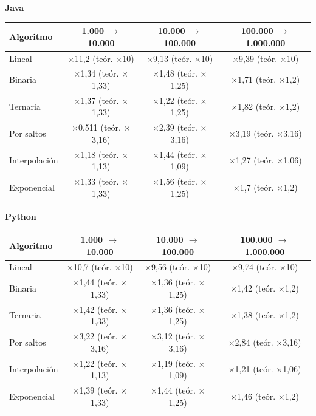 \textbf{Java}\par\smallskip
{\footnotesize
\begin{tabular}{lccc}
\toprule
Algoritmo & 1.000 $\to$ 10.000 & 10.000 $\to$ 100.000 & 100.000 $\to$ 1.000.000 \\
\midrule
Lineal & $\times$11,2 (te\'or. $\times$10) & $\times$9,13 (te\'or. $\times$10) & $\times$9,39 (te\'or. $\times$10) \\
Binaria & $\times$1,34 (te\'or. $\times$1,33) & $\times$1,48 (te\'or. $\times$1,25) & $\times$1,71 (te\'or. $\times$1,2) \\
Ternaria & $\times$1,37 (te\'or. $\times$1,33) & $\times$1,22 (te\'or. $\times$1,25) & $\times$1,82 (te\'or. $\times$1,2) \\
Por saltos & $\times$0,511 (te\'or. $\times$3,16) & $\times$2,39 (te\'or. $\times$3,16) & $\times$3,19 (te\'or. $\times$3,16) \\
Interpolaci\'on & $\times$1,18 (te\'or. $\times$1,13) & $\times$1,44 (te\'or. $\times$1,09) & $\times$1,27 (te\'or. $\times$1,06) \\
Exponencial & $\times$1,33 (te\'or. $\times$1,33) & $\times$1,56 (te\'or. $\times$1,25) & $\times$1,7 (te\'or. $\times$1,2) \\
\bottomrule
\end{tabular}}\par
\medskip
\textbf{Python}\par\smallskip
{\footnotesize
\begin{tabular}{lccc}
\toprule
Algoritmo & 1.000 $\to$ 10.000 & 10.000 $\to$ 100.000 & 100.000 $\to$ 1.000.000 \\
\midrule
Lineal & $\times$10,7 (te\'or. $\times$10) & $\times$9,56 (te\'or. $\times$10) & $\times$9,74 (te\'or. $\times$10) \\
Binaria & $\times$1,44 (te\'or. $\times$1,33) & $\times$1,36 (te\'or. $\times$1,25) & $\times$1,42 (te\'or. $\times$1,2) \\
Ternaria & $\times$1,42 (te\'or. $\times$1,33) & $\times$1,36 (te\'or. $\times$1,25) & $\times$1,38 (te\'or. $\times$1,2) \\
Por saltos & $\times$3,22 (te\'or. $\times$3,16) & $\times$3,12 (te\'or. $\times$3,16) & $\times$2,84 (te\'or. $\times$3,16) \\
Interpolaci\'on & $\times$1,22 (te\'or. $\times$1,13) & $\times$1,19 (te\'or. $\times$1,09) & $\times$1,21 (te\'or. $\times$1,06) \\
Exponencial & $\times$1,39 (te\'or. $\times$1,33) & $\times$1,44 (te\'or. $\times$1,25) & $\times$1,46 (te\'or. $\times$1,2) \\
\bottomrule
\end{tabular}}\par
\medskip
